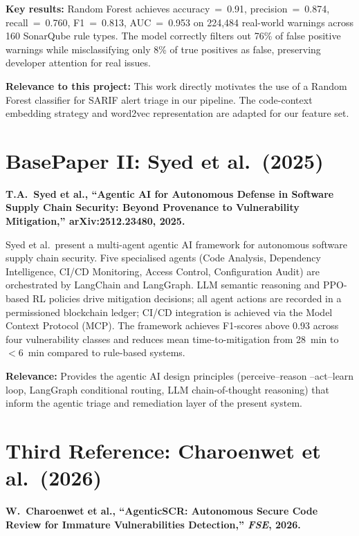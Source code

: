 \textbf{Key results:} Random Forest achieves accuracy~=~0.91, precision~=~0.874,
recall~=~0.760, F1~=~0.813, AUC~=~0.953 on 224,484 real-world warnings across
160 SonarQube rule types. The model correctly filters out 76\% of false positive
warnings while misclassifying only 8\% of true positives as false, preserving
developer attention for real issues.

\textbf{Relevance to this project:} This work directly motivates the use of a
Random Forest classifier for SARIF alert triage in our pipeline. The code-context
embedding strategy and word2vec representation are adapted for our feature set.

\section{BasePaper II: Syed et al.\ (2025)}
\label{sec:bp2}

\textbf{T.A.\ Syed et al., ``Agentic AI for Autonomous Defense in Software Supply
Chain Security: Beyond Provenance to Vulnerability Mitigation,'' arXiv:2512.23480,
2025.} \cite{syed2025agentic}

Syed et al.\ present a multi-agent agentic AI framework for autonomous software
supply chain security. Five specialised agents (Code Analysis, Dependency
Intelligence, CI/CD Monitoring, Access Control, Configuration Audit) are
orchestrated by LangChain and LangGraph. LLM semantic reasoning and PPO-based RL
policies drive mitigation decisions; all agent actions are recorded in a
permissioned blockchain ledger; CI/CD integration is achieved via the Model Context
Protocol (MCP). The framework achieves F1-scores above 0.93 across four
vulnerability classes and reduces mean time-to-mitigation from 28~min to
$<$6~min compared to rule-based systems.

\textbf{Relevance:} Provides the agentic AI design principles (perceive--reason
--act--learn loop, LangGraph conditional routing, LLM chain-of-thought reasoning)
that inform the agentic triage and remediation layer of the present system.

\section{Third Reference: Charoenwet et al.\ (2026)}
\label{sec:3rd}

\textbf{W.\ Charoenwet et al., ``AgenticSCR: Autonomous Secure Code Review for
Immature Vulnerabilities Detection,'' \textit{FSE}, 2026.}
\cite{charoenwet2026agenticscr}

